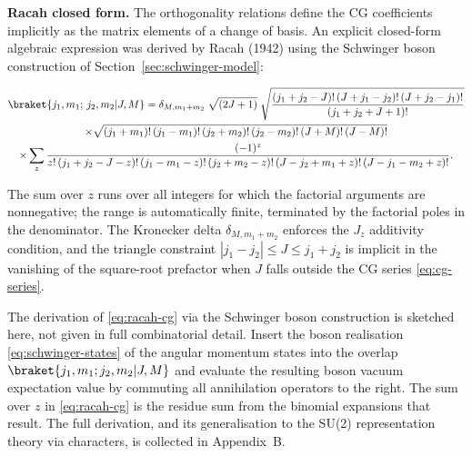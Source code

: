 \medskip\noindent\textbf{Racah closed form.}
The orthogonality relations define the CG coefficients implicitly as the matrix elements of a change of basis. An explicit closed-form algebraic expression was derived by Racah (1942) using the Schwinger boson construction of Section~\ref{sec:schwinger-model}:
\begin{linenomath}
  \begin{multline}
    \braket{j_1,m_1;\,j_2,m_2|J,M}
    = \delta_{M,m_1+m_2}\;
      \sqrt{(2J+1)}\;
      \sqrt{\frac{(j_1+j_2-J)!\,(J+j_1-j_2)!\,(J+j_2-j_1)!}{(j_1+j_2+J+1)!}} \\
    \times \sqrt{(j_1+m_1)!\,(j_1-m_1)!\,(j_2+m_2)!\,(j_2-m_2)!\,(J+M)!\,(J-M)!} \\
    \times \sum_{z} \frac{(-1)^z}{z!\,(j_1+j_2-J-z)!\,(j_1-m_1-z)!\,(j_2+m_2-z)!\,(J-j_2+m_1+z)!\,(J-j_1-m_2+z)!}.
    \label{eq:racah-cg}
  \end{multline}
\end{linenomath}
The sum over $z$ runs over all integers for which the factorial arguments are nonnegative; the range is automatically finite, terminated by the factorial poles in the denominator. The Kronecker delta $\delta_{M,m_1+m_2}$ enforces the $J_z$ additivity condition, and the triangle constraint $|j_1-j_2|\le J\le j_1+j_2$ is implicit in the vanishing of the square-root prefactor when $J$ falls outside the CG series \eqref{eq:cg-series}.

\begin{note}
  The derivation of \eqref{eq:racah-cg} via the Schwinger boson construction is sketched here, not given in full combinatorial detail. Insert the boson realisation \eqref{eq:schwinger-states} of the angular momentum states into the overlap $\braket{j_1,m_1;j_2,m_2|J,M}$ and evaluate the resulting boson vacuum expectation value by commuting all annihilation operators to the right. The sum over $z$ in \eqref{eq:racah-cg} is the residue sum from the binomial expansions that result. The full derivation, and its generalisation to the SU(2) representation theory via characters, is collected in Appendix~B.
\end{note}

